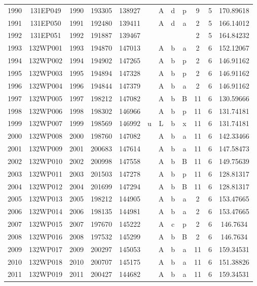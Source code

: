 \begin{tabular}{|*{12}{c|}}
1990 & 131EP049 & 1990 & 193305 & 138927 &  & A & d & p & 9 & 5 & 170.89618 \\ 
1991 & 131EP050 & 1991 & 192480 & 139411 &  & A & d & a & 2 & 5 & 166.14012 \\ 
1992 & 131EP051 & 1992 & 191887 & 139467 &  &  &  &  & 2 & 5 & 164.84232 \\ 
1993 & 132WP001 & 1993 & 194870 & 147013 &  & A & b & a & 2 & 6 & 152.12067 \\ 
1994 & 132WP002 & 1994 & 194902 & 147265 &  & A & b & p & 2 & 6 & 146.91162 \\ 
1995 & 132WP003 & 1995 & 194894 & 147328 &  & A & b & p & 2 & 6 & 146.91162 \\ 
1996 & 132WP004 & 1996 & 194844 & 147379 &  & A & b & a & 2 & 6 & 146.91162 \\ 
1997 & 132WP005 & 1997 & 198212 & 147082 &  & A & b & B & 11 & 6 & 130.59666 \\ 
1998 & 132WP006 & 1998 & 198302 & 146966 &  & A & b & p & 11 & 6 & 131.74181 \\ 
1999 & 132WP007 & 1999 & 198569 & 146992 & u & L & b & x & 11 & 6 & 131.74181 \\ 
2000 & 132WP008 & 2000 & 198760 & 147082 &  & A & b & a & 11 & 6 & 142.33466 \\ 
2001 & 132WP009 & 2001 & 200683 & 147614 &  & A & b & a & 11 & 6 & 147.58473 \\ 
2002 & 132WP010 & 2002 & 200998 & 147558 &  & A & b & B & 11 & 6 & 149.75639 \\ 
2003 & 132WP011 & 2003 & 201503 & 147278 &  & A & b & p & 11 & 6 & 128.81317 \\ 
2004 & 132WP012 & 2004 & 201699 & 147294 &  & A & b & B & 11 & 6 & 128.81317 \\ 
2005 & 132WP013 & 2005 & 198212 & 144905 &  & A & b & a & 2 & 6 & 153.47665 \\ 
2006 & 132WP014 & 2006 & 198135 & 144981 &  & A & b & a & 2 & 6 & 153.47665 \\ 
2007 & 132WP015 & 2007 & 197670 & 145222 &  & A & c & p & 2 & 6 & 146.7634 \\ 
2008 & 132WP016 & 2008 & 197532 & 145299 &  & A & b & B & 2 & 6 & 146.7634 \\ 
2009 & 132WP017 & 2009 & 200297 & 145053 &  & A & b & a & 11 & 6 & 159.34531 \\ 
2010 & 132WP018 & 2010 & 200707 & 145175 &  & A & b & a & 11 & 6 & 151.38826 \\ 
2011 & 132WP019 & 2011 & 200427 & 144682 &  & A & b & a & 11 & 6 & 159.34531 \\ 

\end{tabular}
